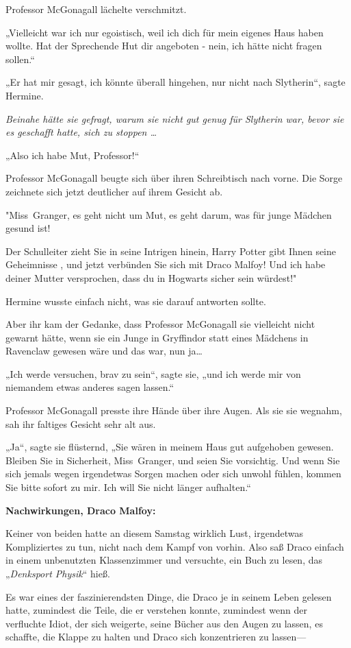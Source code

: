 {Professor McGonagall lächelte verschmitzt.

„Vielleicht war ich nur egoistisch, weil ich dich für mein eigenes Haus haben wollte. Hat der Sprechende Hut dir angeboten - nein, ich hätte nicht fragen sollen.“

„Er hat mir gesagt, ich könnte überall hingehen, nur nicht nach Slytherin“, sagte Hermine.

\emph{Beinahe hätte sie gefragt, warum sie nicht gut genug für Slytherin war, bevor sie es geschafft hatte, sich zu stoppen …}

„Also ich habe Mut, Professor!“

Professor McGonagall beugte sich über ihren Schreibtisch nach vorne. Die Sorge zeichnete sich jetzt deutlicher auf ihrem Gesicht ab.

"Miss~Granger, es geht nicht um Mut, es geht darum, was für junge Mädchen gesund ist!

Der Schulleiter zieht Sie in seine Intrigen hinein, Harry Potter gibt Ihnen seine Geheimnisse , und jetzt verbünden Sie sich mit Draco Malfoy! Und ich habe deiner Mutter versprochen, dass du in Hogwarts sicher sein würdest!"

Hermine wusste einfach nicht, was sie darauf antworten sollte.

Aber ihr kam der Gedanke, dass Professor McGonagall sie vielleicht nicht gewarnt hätte, wenn sie ein Junge in Gryffindor statt eines Mädchens in Ravenclaw gewesen wäre und das war, nun ja…

„Ich werde versuchen, brav zu sein“, sagte sie, „und ich werde mir von niemandem etwas anderes sagen lassen.“

Professor McGonagall presste ihre Hände über ihre Augen. Als sie sie wegnahm, sah ihr faltiges Gesicht sehr alt aus.

„Ja“, sagte sie flüsternd, „Sie wären in meinem Haus gut aufgehoben gewesen. Bleiben Sie in Sicherheit, Miss~Granger, und seien Sie vorsichtig. Und wenn Sie sich jemals wegen irgendetwas Sorgen machen oder sich unwohl fühlen, kommen Sie bitte sofort zu mir. Ich will Sie nicht länger aufhalten.“

\textbf{Nachwirkungen, Draco Malfoy:}

Keiner von beiden hatte an diesem Samstag wirklich Lust, irgendetwas Kompliziertes zu tun, nicht nach dem Kampf von vorhin. Also saß Draco einfach in einem unbenutzten Klassenzimmer und versuchte, ein Buch zu lesen, das „\emph{Denksport Physik}“ hieß.

Es war eines der faszinierendsten Dinge, die Draco je in seinem Leben gelesen hatte, zumindest die Teile, die er verstehen konnte, zumindest wenn der verfluchte Idiot, der sich weigerte, seine Bücher aus den Augen zu lassen, es schaffte, die Klappe zu halten und Draco sich konzentrieren zu lassen—

}
